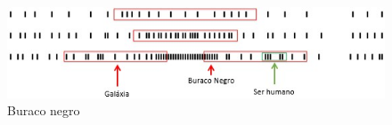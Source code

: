 \begin{figure}[H]
\caption{Buraco negro}
\label{fig:consciousness_black_hole}
\centering
\includegraphics[scale=1]{sections/images/consciousness_black_hole.jpg}
\end{figure}
